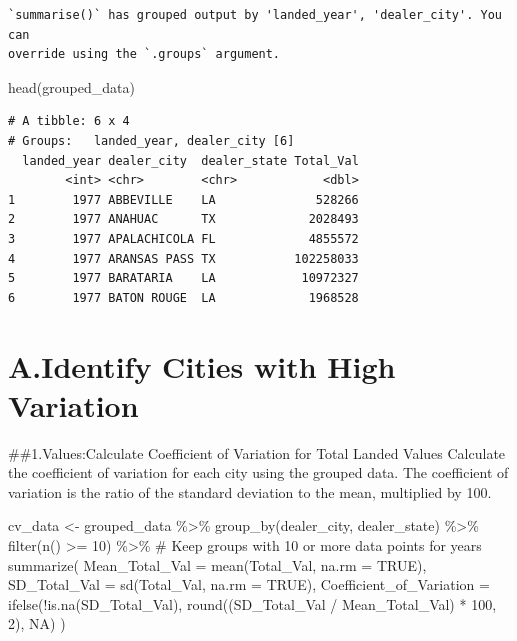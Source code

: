 \documentclass[
  letterpaper,
  DIV=11,
  numbers=noendperiod]{scrartcl}
\newenvironment{Shaded}{\begin{snugshade}}{\end{snugshade}}
\newcommand{\AttributeTok}[1]{\textcolor[rgb]{0.40,0.45,0.13}{#1}}
\newcommand{\CommentTok}[1]{\textcolor[rgb]{0.37,0.37,0.37}{#1}}
\newcommand{\ConstantTok}[1]{\textcolor[rgb]{0.56,0.35,0.01}{#1}}
\newcommand{\DecValTok}[1]{\textcolor[rgb]{0.68,0.00,0.00}{#1}}
\newcommand{\FunctionTok}[1]{\textcolor[rgb]{0.28,0.35,0.67}{#1}}
\newcommand{\NormalTok}[1]{\textcolor[rgb]{0.00,0.23,0.31}{#1}}
\newcommand{\OtherTok}[1]{\textcolor[rgb]{0.00,0.23,0.31}{#1}}
\newcommand{\SpecialCharTok}[1]{\textcolor[rgb]{0.37,0.37,0.37}{#1}}
\begin{document}
\begin{verbatim}
`summarise()` has grouped output by 'landed_year', 'dealer_city'. You can
override using the `.groups` argument.
\end{verbatim}

\begin{Shaded}
\begin{Highlighting}[]
\FunctionTok{head}\NormalTok{(grouped\_data)}
\end{Highlighting}
\end{Shaded}

\begin{verbatim}
# A tibble: 6 x 4
# Groups:   landed_year, dealer_city [6]
  landed_year dealer_city  dealer_state Total_Val
        <int> <chr>        <chr>            <dbl>
1        1977 ABBEVILLE    LA              528266
2        1977 ANAHUAC      TX             2028493
3        1977 APALACHICOLA FL             4855572
4        1977 ARANSAS PASS TX           102258033
5        1977 BARATARIA    LA            10972327
6        1977 BATON ROUGE  LA             1968528
\end{verbatim}

\hypertarget{a.identify-cities-with-high-variation}{%
\section{A.Identify Cities with High
Variation}\label{a.identify-cities-with-high-variation}}

\#\#1.Values:Calculate Coefficient of Variation for Total Landed Values
Calculate the coefficient of variation for each city using the grouped
data. The coefficient of variation is the ratio of the standard
deviation to the mean, multiplied by 100.

\begin{Shaded}
\begin{Highlighting}[]
\NormalTok{cv\_data }\OtherTok{\textless{}{-}}\NormalTok{ grouped\_data }\SpecialCharTok{\%\textgreater{}\%}
  \FunctionTok{group\_by}\NormalTok{(dealer\_city, dealer\_state) }\SpecialCharTok{\%\textgreater{}\%}
  \FunctionTok{filter}\NormalTok{(}\FunctionTok{n}\NormalTok{() }\SpecialCharTok{\textgreater{}=} \DecValTok{10}\NormalTok{) }\SpecialCharTok{\%\textgreater{}\%}  \CommentTok{\# Keep groups with 10 or more data points for years}
  \FunctionTok{summarize}\NormalTok{(}
    \AttributeTok{Mean\_Total\_Val =} \FunctionTok{mean}\NormalTok{(Total\_Val, }\AttributeTok{na.rm =} \ConstantTok{TRUE}\NormalTok{),}
    \AttributeTok{SD\_Total\_Val =} \FunctionTok{sd}\NormalTok{(Total\_Val, }\AttributeTok{na.rm =} \ConstantTok{TRUE}\NormalTok{),}
    \AttributeTok{Coefficient\_of\_Variation =} \FunctionTok{ifelse}\NormalTok{(}\SpecialCharTok{!}\FunctionTok{is.na}\NormalTok{(SD\_Total\_Val), }\FunctionTok{round}\NormalTok{((SD\_Total\_Val }\SpecialCharTok{/}\NormalTok{ Mean\_Total\_Val) }\SpecialCharTok{*} \DecValTok{100}\NormalTok{, }\DecValTok{2}\NormalTok{), }\ConstantTok{NA}\NormalTok{)}
\NormalTok{  )}
\end{Highlighting}
\end{Shaded}
\end{document}

